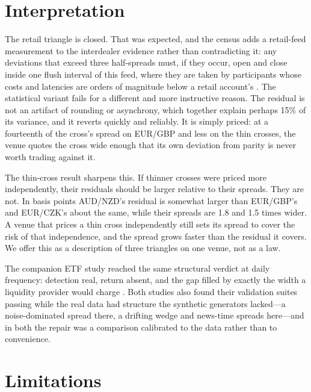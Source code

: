 \documentclass[11pt]{article}
\begin{document}
\section{Interpretation}\label{sec:interp}

The retail triangle is closed. That was expected, and the census adds
a retail-feed measurement to the interdealer evidence rather than
contradicting it: any deviations that exceed three half-spreads must,
if they occur, open and close inside one flush interval of this feed,
where they are taken by participants
whose costs and latencies are orders of magnitude below a retail
account's \cite{chaboud2014,ito2020}. The statistical variant fails for
a different and more instructive reason. The residual is not an
artifact of rounding or asynchrony, which together explain perhaps
15\% of its variance, and it reverts quickly and reliably. It is simply
priced: at a fourteenth of the cross's spread on EUR/GBP and less on
the thin crosses, the venue quotes the cross wide enough that its own
deviation from parity is never worth trading against it.

The thin-cross result sharpens this. If thinner crosses were priced
more independently, their residuals should be larger relative to their
spreads. They are not. In basis points AUD/NZD's residual is somewhat
larger than EUR/GBP's and EUR/CZK's about the same, while their spreads
are 1.8 and 1.5 times wider. A venue that prices a thin cross
independently still sets its spread to cover the risk of that
independence, and the spread grows faster than the residual it
covers. We offer this as a description of three triangles on one
venue, not as a law.

The companion ETF study reached the same structural verdict at daily
frequency: detection real, return absent, and the gap filled by
exactly the width a liquidity provider would charge \cite{ross2026}.
Both studies also found their validation suites passing while the real
data had structure the synthetic generators lacked---a noise-dominated
spread there, a drifting wedge and news-time spreads here---and in both
the repair was a comparison calibrated to the data rather than to
convenience.

\section{Limitations}
\end{document}
